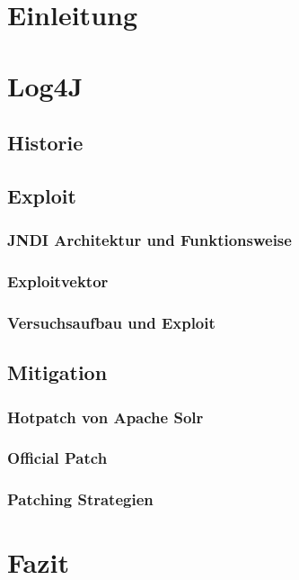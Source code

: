 

\section{Einleitung}
\section{Log4J}
\subsection{Historie}



\subsection{Exploit}
\subsubsection{JNDI Architektur und Funktionsweise}
\subsubsection{Exploitvektor}
\subsubsection{Versuchsaufbau und Exploit}
\subsection{Mitigation}

\subsubsection{Hotpatch von Apache Solr}
\subsubsection{Official Patch}
\subsubsection{Patching Strategien}
\section{Fazit}

%
